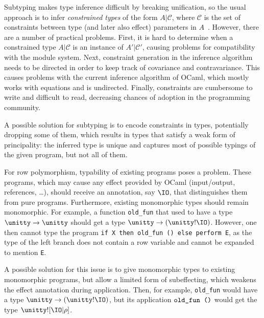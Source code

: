\documentclass[a4paper,UKenglish]{dagrep}
\begin{document}
Subtyping makes type inference difficult by breaking unification, so the usual approach is to infer \emph{constrained types} of the form $A | \mathcal{C}$, where $\mathcal{C}$ is the set of constraints between type (and later also effect) parameters in $A$~\cite{pottier-thesis}. However, there are a number of practical problems. First, it is hard to determine when a constrained type $A | \mathcal{C}$ is an instance of $A' | \mathcal{C}'$, causing problems for compatibility with the module system. Next, constraint generation in the inference algorithm needs to be directed in order to keep track of covariance and contravariance. This causes problems with the current inference algorithm of OCaml, which mostly works with equations and is undirected. Finally, constraints are cumbersome to write and difficult to read, decreasing chances of adoption in the programming community.

A possible solution for subtyping is to encode constraints in types, potentially dropping some of them, which results in types that satisfy a weak form of principality: the inferred type is unique and captures most of possible typings of the given program, but not all of them.

For row polymorphism, typability of existing programs poses a problem. These programs, which may cause any effect provided by OCaml (input/output, references, \ldots), should receive an annotation, say $\IO$, that distinguishes them from pure programs. Furthermore, existing monomorphic types should remain monomorphic. For example, a function \verb|old_fun| that used to have a type $\unitty \to \unitty$ should get a type $\unitty \to (\unitty ! \IO)$. However, one then cannot type the program \verb|if X then old_fun () else perform E|, as the type of the left branch does not contain a row variable and cannot be expanded to mention \verb|E|.

A possible solution for this issue is to give monomorphic types to existing monomorphic programs, but allow a limited form of subeffecting, which weakens the effect annotation during application. Then, for example, \verb|old_fun| would have a type $\unitty \to (\unitty ! \IO)$, but its application $\verb|old_fun ()|$ would get the type $\unitty ! [\IO | \rho]$.

% 
% 
\end{document}
